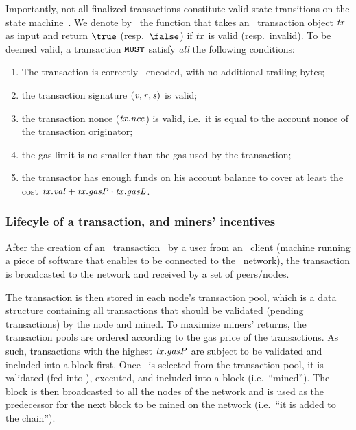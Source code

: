 Importantly, not all finalized transactions constitute valid state transitions on the state machine~\cite[Section 6]{ethyellowpaper}.
We denote by \ethVerifyTx~the function that takes an \ethereum~transaction object $\mathit{tx}$ as input and return $\true$ (resp.~$\false$) if $\mathit{tx}$ is valid (resp.~invalid). To be deemed valid, a transaction $\textbf{\texttt{MUST}}$ satisfy \emph{all} the following conditions:
\begin{enumerate}
    \item The transaction is correctly \rlp~encoded, with no additional trailing bytes;
    \item the transaction signature $({\mathit{v}, \mathit{r}, \mathit{s}})$ is valid;
    \item the transaction nonce ($\mathit{tx}.\mathit{nce}$) is valid, i.e.~it is equal to the account nonce of the transaction originator;
    \item the gas limit is no smaller than the gas used by the transaction;
    \item the transactor has enough funds on his account balance to cover at least the cost $\mathit{tx}.\mathit{val} + \mathit{tx}.\mathit{gasP} \cdot \mathit{tx}.\mathit{gasL}$.
\end{enumerate}

\subsubsection{Lifecyle of a transaction, and miners' incentives}\label{preliminaries:ethereum:eth-tx:tx-life}

After the creation of an \ethereum~transaction \tx~by a user from an \ethereum~client (machine running a piece of software that enables to be connected to the \ethereum~network), the transaction is broadcasted to the network and received by a set of peers/nodes.

The transaction is then stored in each node's transaction pool, which is a data structure containing all transactions that should be validated (pending transactions) by the node and mined. To maximize miners' returns, the transaction pools are ordered according to the gas price of the transactions. As such, transactions with the highest $\mathit{tx}.\mathit{gasP}$ are subject to be validated and included into a block first.
Once \tx~is selected from the transaction pool, it is validated (fed into \ethVerifyTx), executed, and included into a block (i.e.~``mined''). The block is then broadcasted to all the nodes of the network and is used as the predecessor for the next block to be mined on the network (i.e.~``it is added to the chain'').

